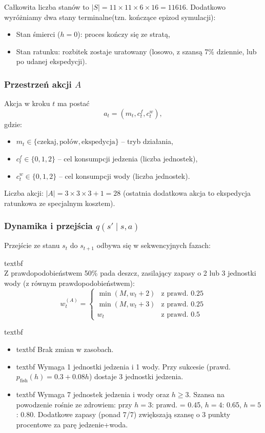 Całkowita liczba stanów to $|S| = 11 \times 11 \times 6 \times 16 = 11616$. Dodatkowo wyróżniamy dwa stany terminalne(tzn. kończące epizod symulacji):
\begin{itemize}
    \item Stan śmierci ($h=0$): proces kończy się ze stratą,
    \item Stan ratunku: rozbitek zostaje uratowany (losowo, z szansą 7\% dziennie, lub po udanej ekspedycji).
\end{itemize}

\subsubsection{Przestrzeń akcji $A$}

Akcja w kroku $t$ ma postać
\[
a_t=(m_t, c^f_t, c^w_t),
\]
gdzie:
\begin{itemize}
    \item $m_t \in \{\text{czekaj}, \text{połów}, \text{ekspedycja}\}$ -- tryb działania,
    \item $c^f_t \in \{0, 1, 2\}$ -- cel konsumpcji jedzenia (liczba jednostek),
    \item $c^w_t \in \{0, 1, 2\}$ -- cel konsumpcji wody (liczba jednostek).
\end{itemize}

Liczba akcji: $|A| = 3 \times 3 \times 3 + 1 = 28$ (ostatnia dodatkowa akcja to ekspedycja ratunkowa ze specjalnym kosztem).

\subsubsection{Dynamika i przejścia $q(s'\mid s,a)$}

Przejście ze stanu $s_t$ do $s_{t+1}$ odbywa się w sekwencyjnych fazach:

\noindent\csname textbf
\\ Z prawdopodobieństwem 50\% pada deszcz, zasilający zapasy o 2 lub 3 jednostki wody (z równym prawdopodobieństwem):
\[
w_t^{(A)} = \begin{cases}
\min(M, w_t + 2) & \text{z prawd. } 0.25 \\
\min(M, w_t + 3) & \text{z prawd. } 0.25 \\
w_t & \text{z prawd. } 0.5
\end{cases}
\]

\noindent\csname textbf 
\begin{itemize}
    \item \csname textbf Brak zmian w zasobach.
    \item \csname textbf Wymaga 1 jednostki jedzenia i 1 wody. Przy sukcesie (prawd. $p_{\mathrm{fish}}(h) = 0.3 + 0.08h$) dostaje 3 jednostki jedzenia.
    \item \csname textbf Wymaga 7 jednostek jedzenia i wody oraz $h \ge 3$. Szansa na powodzenie rośnie ze zdrowiem: przy $h=3$: prawd. = 0.45, $h=4$: 0.65, $h=5$: 0.80. Dodatkowe zapasy (ponad 7/7) zwiększają szansę o 3 punkty procentowe za parę jedzenie+woda.
\end{itemize}

